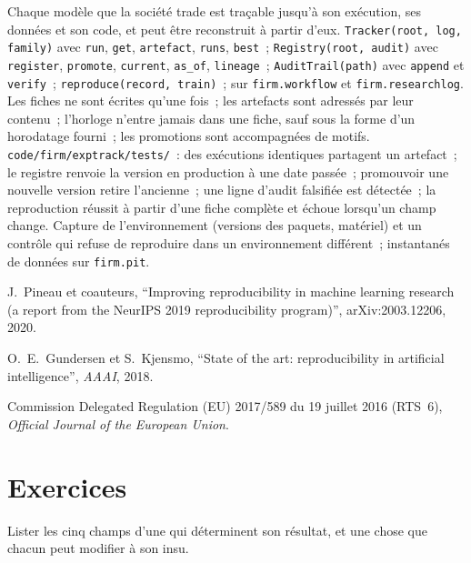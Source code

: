 \begin{build}
 Chaque modèle que la société trade est traçable jusqu'à son exécution, ses données et son code, et peut être reconstruit à partir d'eux.
 \texttt{Tracker(root, log, family)} avec \texttt{run}, \texttt{get}, \texttt{artefact}, \texttt{runs},
\texttt{best}~; \texttt{Registry(root, audit)} avec \texttt{register}, \texttt{promote}, \texttt{current}, \texttt{as\_of},
\texttt{lineage}~; \texttt{AuditTrail(path)} avec \texttt{append} et \texttt{verify}~; \texttt{reproduce(record, train)}~; sur
\texttt{firm.workflow} et \texttt{firm.researchlog}.
 Les fiches ne sont écrites qu'une fois~; les artefacts sont adressés par leur contenu~; l'horloge n'entre jamais dans une fiche, sauf
sous la forme d'un horodatage fourni~; les promotions sont accompagnées de motifs.
 \texttt{code/firm/exptrack/tests/}~: des exécutions identiques partagent un artefact~; le registre renvoie la version
en production à une date passée~; promouvoir une nouvelle version retire l'ancienne~; une ligne d'audit falsifiée est détectée~; la reproduction réussit
à partir d'une fiche complète et échoue lorsqu'un champ change.
 Capture de l'environnement (versions des paquets, matériel) et un contrôle qui refuse de reproduire dans un environnement
différent~; instantanés de données sur \texttt{firm.pit}.
\end{build}

\begin{omsources}
\item J.~Pineau et coauteurs, ``Improving reproducibility in machine learning research (a report from the NeurIPS 2019
reproducibility program)'', arXiv:2003.12206, 2020.
\item O.~E.~Gundersen et S.~Kjensmo, ``State of the art: reproducibility in artificial intelligence'', \emph{AAAI}, 2018.
\item Commission Delegated Regulation (EU) 2017/589 du 19 juillet 2016 (RTS~6), \emph{Official Journal of the European Union}.
\end{omsources}

\section{Exercices}

\begin{exercise}[$\star$]\label{exo:ml:experiment-tracking-and-reproducibility:1}
Lister les cinq champs d'une  qui déterminent son résultat, et une chose que chacun peut modifier à son insu.
\end{exercise}

